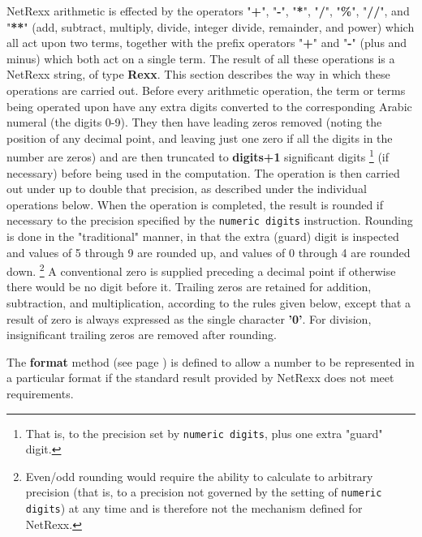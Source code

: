NetRexx arithmetic is effected by the operators "\textbf{+}",
"\textbf{-}", "\textbf{*}", "\textbf{/}",
"\textbf{\%}", "\textbf{//}", and "\textbf{**}"
(add, subtract, multiply, divide, integer divide, remainder, and power)
which all act upon two terms, together with the prefix operators
"\textbf{+}" and "\textbf{-}" (plus and minus)
which both act on a single term.
The result of all these operations is a NetRexx string, of
type \textbf{Rexx}.
This section describes the way in which these operations are carried
out.
 Before every arithmetic operation, the term or terms being operated
upon have any extra digits converted to the corresponding Arabic numeral
(the digits 0-9).  They then have leading zeros removed (noting the
position of any decimal point, and leaving just one zero if all the
digits in the number are zeros) and are then truncated
to \textbf{digits+1} significant digits
\footnote{
That is, to the precision set by \texttt{numeric digits}, plus one extra
"guard" digit.
}
(if necessary) before being used in the computation.
The operation is then carried out under up to double that precision, as
described under the individual operations below.
When the operation is completed, the result is rounded if necessary to
the precision specified by the \texttt{numeric digits} instruction.
 Rounding is done in the "traditional" manner, in that the extra
(guard) digit is inspected and values of 5 through 9 are rounded up,
and values of 0 through 4 are rounded down.
\footnote{
\index{,}
Even/odd rounding would require the ability to calculate to arbitrary
precision (that is, to a precision not governed by the setting of
\texttt{numeric digits}) at any time and is therefore not the mechanism
defined for NetRexx.
}
 A conventional zero is supplied preceding a decimal point if
otherwise there would be no digit before it.  Trailing zeros are
retained for addition, subtraction, and multiplication, according to
the rules given below, except that a result of zero is always expressed
as the single character \textbf{'0'}.  For division, insignificant
trailing zeros are removed after rounding.
 
The  \textbf{format} method (see page \pageref{refformat})  is defined to allow a
number to be represented in a particular format if the standard result
provided by NetRexx does not meet requirements.
